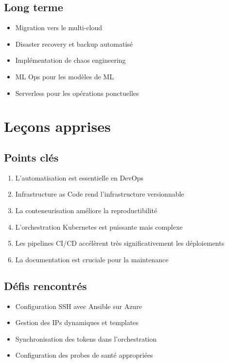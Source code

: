 \documentclass[12pt,a4paper,twoside]{report}
\begin{document}
\subsection{Long terme}

\begin{itemize}
    \item Migration vers le multi-cloud
    \item Disaster recovery et backup automatisé
    \item Implémentation de chaos engineering
    \item ML Ops pour les modèles de ML
    \item Serverless pour les opérations ponctuelles
\end{itemize}

\section{Leçons apprises}

\subsection{Points clés}

\begin{enumerate}
    \item L'automatisation est essentielle en DevOps
    \item Infrastructure as Code rend l'infrastructure versionnable
    \item La conteneurisation améliore la reproductibilité
    \item L'orchestration Kubernetes est puissante mais complexe
    \item Les pipelines CI/CD accélèrent très significativement les déploiements
    \item La documentation est cruciale pour la maintenance
\end{enumerate}

\subsection{Défis rencontrés}

\begin{itemize}
    \item Configuration SSH avec Ansible sur Azure
    \item Gestion des IPs dynamiques et templates
    \item Synchronisation des tokens dans l'orchestration
    \item Configuration des probes de santé appropriées
\end{itemize}
\end{document}
